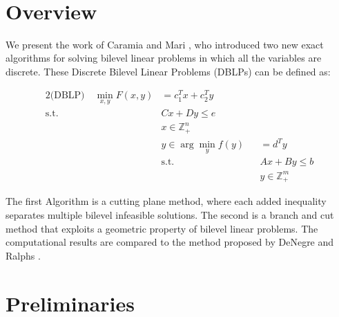 \documentclass{article}
\title{
	\centering
	\begin{figure*}[!hb]
		\begin{minipage}{1\textwidth}
			\hspace*{-.06\linewidth}
		\end{minipage} 
	\end{figure*}
	\vspace{5cm}
	{\huge\textbf{\Title}}\\ 
	\vspace{1cm}
	{\huge{\Seminar}\\}
	\vspace{0.6cm} 
	{\mdseries\large \Author }
	\vspace{1cm}
}
\begin{document}
	
	\maketitle
	\newpage
\section{Overview}

We present the work of Caramia and Mari \cite{Caramia2015}, who introduced two new exact algorithms for solving bilevel linear problems in which all the variables are discrete. These Discrete Bilevel Linear Problems (DBLPs) can be defined as:

		\begin{alignat*}{2}
		\text{(DBLP)} \quad \min_{x,y} F(x,y) &= c_1^Tx +c_2^Ty \\
		\text{s.t.} \quad &Cx + Dy \le e \\
		&x \in \mathbb{Z}^n_+ \\
		&y \in \arg \min_y f(y) &&= d^T y \\
		&\text{s.t.} &&Ax+By \le b \\
		& &&y \in \mathbb{Z}^m_+
		\end{alignat*}
		
The first Algorithm is a cutting plane method, where each added inequality separates multiple bilevel infeasible solutions. The second is a branch and cut method that exploits a geometric property of bilevel linear problems. 
The computational results are compared to the method proposed by DeNegre and Ralphs \cite{DeNegre2009}.

\section{Preliminaries}
\end{document}
